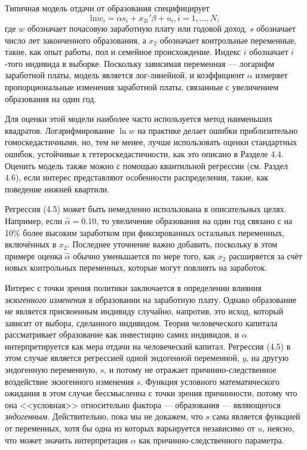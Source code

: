 Типичная модель отдачи от образования специфицирует
\begin{equation}
\mathrm{ln} w_i = \alpha s_i + x_{2i}' \beta + u_i, i=1, \ldots , N,
\end{equation}
где $w$ обозначает почасовую заработную плату или годовой доход, $s$ обозначает число лет законченного образования, а $x_{2}$ обозначает контрольные переменные, такие, как опыт работы, пол и семейное происхождение. Индекс $i$ обозначает $i$-того индивида в выборке. Поскольку зависимая переменная --- логарифм заработной платы, модель является лог-линейной, и коэффициент $\alpha$  измеряет пропорциональные изменения заработной платы, связанные с увеличением образования на один год.

Для оценки этой модели наиболее часто используется метод наименьших квадратов. Логарифмирование  $\ln w$ на практике делает ошибки приблизительно гомоскедастичными, но, тем не менее, лучше использовать оценки стандартных ошибок, устойчивые к гетероскедастичности, как это описано в Разделе 4.4. Оценить модель также можно с помощью квантильной регрессии (см. Раздел 4.6), если интерес представляют особенности распределения, такие, как поведение нижней квартили. 

Регрессия (4.5) может быть немедленно использована в описательных целях. Например, если $\hat{\alpha}=0.10$, то увеличение образования на один год связано с на 10\% более высоким заработком при фиксированных остальных переменных, включённых в $x_{2}$. Последнее уточнение важно добавить, поскольку в этом примере оценка  $\hat{\alpha}$ обычно уменьшается по мере того, как $x_{2}$ расширяется за счёт новых контрольных переменных, которые могут повлиять на заработок.

Интерес с точки зрения политики заключается в определении влияния \textit{экзогенного изменения} в образовании на заработную плату. Однако образование не является присвоенным индивиду случайно, напротив, это исход, который зависит от выбора, сделанного индивидом. Теория человеческого капитала рассматривает образование как инвестицию самих индивидов, и $\alpha$ интерпретируется как мера отдачи на человеческий капитал. Регрессия (4.5) в этом случае является регрессией одной эндогенной переменной, $y$, на другую эндогенную переменную, $s$, и потому не отражает причинно-следственное воздействие экзогенного изменения $s$. Функция условного математического ожидания в этом случае бессмысленна с точки зрения причинности, потому что она <<условная>> относительно фактора --- образования --- являющегося \textit{эндогенным}. Действительно, пока мы не докажем, что $s$ сама является функцией от переменных, хотя бы одна из которых варьируется независимо от $u$, неясно, что может значить интерпретация $\alpha$ как причинно-следственного параметра.

